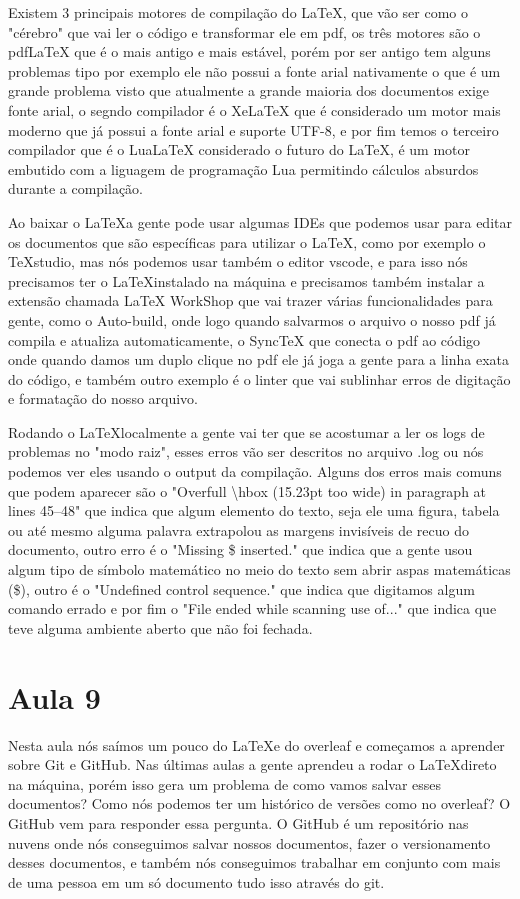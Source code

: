 Existem 3 principais motores de compilação do \LaTeX, que vão ser como o "cérebro" que vai ler o código e transformar ele em pdf, os três motores são o pdfLaTeX que é o mais antigo e mais estável, porém por ser antigo tem alguns problemas tipo por exemplo ele não possui a fonte arial nativamente o que é um grande problema visto que atualmente a grande maioria dos documentos exige fonte arial, o segndo compilador é o XeLaTeX que é considerado um motor mais moderno que já possui a fonte arial e suporte UTF-8, e por fim temos o terceiro compilador que é o LuaLaTeX considerado o futuro do \LaTeX, é um motor embutido com a liguagem de programação Lua permitindo cálculos absurdos durante a compilação.

Ao baixar o \LaTeX a gente pode usar algumas IDEs que podemos usar para editar os documentos que são específicas para utilizar o \LaTeX, como por exemplo o TeXstudio, mas nós podemos usar também o editor vscode, e para isso nós precisamos ter o \LaTeX instalado na máquina e precisamos também instalar a extensão chamada LaTeX WorkShop que vai trazer várias funcionalidades para gente, como o Auto-build, onde logo quando salvarmos o arquivo o nosso pdf já compila e atualiza automaticamente, o SyncTeX que conecta o pdf ao código onde quando damos um duplo clique no pdf ele já joga a gente para a linha exata do código, e também outro exemplo é o linter que vai sublinhar erros de digitação e formatação do nosso arquivo.

Rodando o \LaTeX localmente a gente vai ter que se acostumar a ler os logs de problemas no "modo raiz", esses erros vão ser descritos no arquivo .log ou nós podemos ver eles usando o output da compilação. Alguns dos erros mais comuns que podem aparecer são o "Overfull \textbackslash hbox (15.23pt too wide) in paragraph at lines 45--48" que indica que algum elemento do texto, seja ele uma figura, tabela ou até mesmo alguma palavra extrapolou as margens invisíveis de recuo do documento, outro erro é o "Missing \$ inserted." que indica que a gente usou algum tipo de símbolo matemático no meio do texto sem abrir aspas matemáticas (\$), outro é o "Undefined control sequence." que indica que digitamos algum comando errado e por fim o "File ended while scanning use of..." que indica que teve alguma ambiente aberto que não foi fechada.


\section{Aula 9}
Nesta aula nós saímos um pouco do \LaTeX e do overleaf e começamos a aprender sobre Git e GitHub. Nas últimas aulas a gente aprendeu a rodar o \LaTeX direto na máquina, porém isso gera um problema de como vamos salvar esses documentos? Como nós podemos ter um histórico de versões como no overleaf? O GitHub vem para responder essa pergunta. O GitHub é um repositório nas nuvens onde nós conseguimos salvar nossos documentos, fazer o versionamento desses documentos, e também nós conseguimos trabalhar em conjunto com mais de uma pessoa em um só documento tudo isso através do git. 

